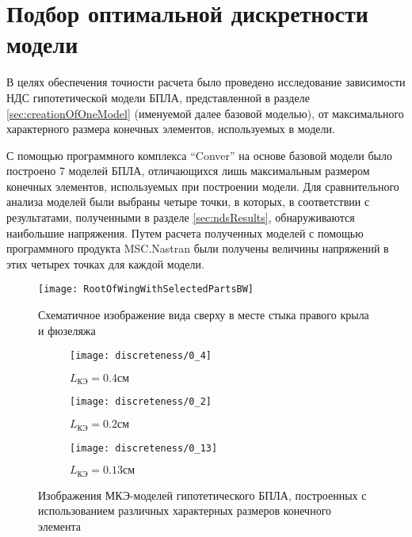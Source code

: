 \section{Подбор оптимальной дискретности модели}
\label{sec:optimalMKESize}

В целях обеспечения точности расчета было проведено исследование зависимости 
НДС гипотетической модели БПЛА, представленной в разделе \ref{sec:creationOfOneModel} (именуемой далее базовой моделью), от максимального характерного размера конечных элементов, используемых в модели. 

С помощью программного комплекса ``Conver'' на основе базовой модели было построено 7 моделей БПЛА, отличающихся лишь максимальным размером конечных элементов, используемых при построении модели. Для сравнительного анализа моделей были выбраны четыре точки, в которых, в соответствии с результатами, полученными в разделе \ref{sec:ndsResults}, обнаруживаются наибольшие напряжения. Путем расчета полученных моделей с помощью программного продукта MSC.Nastran были получены величины напряжений в этих четырех точках для каждой модели.


\begin{figure}[ht]
\centering
\texttt{[image: RootOfWingWithSelectedPartsBW]}
\caption{Схематичное изображение вида сверху в месте стыка правого крыла и фюзеляжа}
\label{fig:WingRootPlain}
\end{figure}


\begin{figure}[H]
\captionsetup{justification=centering}
\centering
	\begin{subfigure}[b]{0.8\textwidth}
	\texttt{[image: discreteness/0\_4]}
	\caption{$L_\text{КЭ} = 0.4см$}
	\label{fig:discr:0_4}
	\end{subfigure}
	\begin{subfigure}[b]{0.8\textwidth}
	\texttt{[image: discreteness/0\_2]}
	\caption{$L_\text{КЭ} = 0.2см$}
	\label{fig:discr:0_2}
	\end{subfigure}
	\begin{subfigure}[b]{0.8\textwidth}
	\texttt{[image: discreteness/0\_13]}
	\caption{$L_\text{КЭ} = 0.13см$}
	\label{fig:discr:0_13}
	\end{subfigure}
\label{fig:discreteness}
\caption{Изображения МКЭ-моделей гипотетического БПЛА, построенных с использованием различных характерных размеров конечного элемента}
\end{figure}





